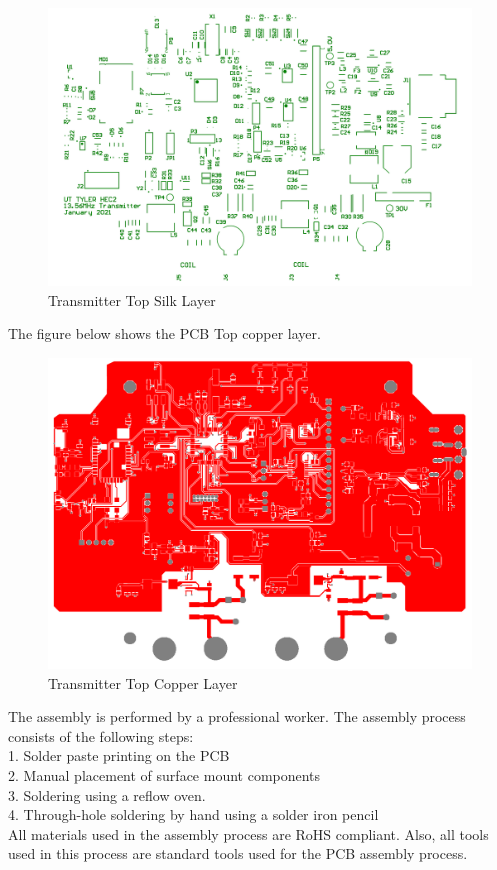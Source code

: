 \documentclass[12pt]{article}
\begin{document}
\begin{figure}[h!]
\centering
\includegraphics[width=0.75\linewidth]{tx_pcb_tslk}
\caption{Transmitter Top Silk Layer}
\end{figure}

The figure below shows the PCB Top copper layer.
\hfill

\begin{figure}[h!]
\centering
\includegraphics[width=0.75\linewidth]{tx_pcb_top_metal}
\caption{Transmitter Top Copper Layer}
\end{figure}

\hfill
\pagebreak
\hfill

\noindent
The assembly is performed by a professional worker. The assembly process consists of the following steps:\\
1.    Solder paste printing on the PCB\\
2.    Manual placement of surface mount components\\
3.    Soldering using a reflow oven.\\
4.    Through-hole soldering by hand using a solder iron pencil\\
 
 \noindent
All materials used in the assembly process are  RoHS compliant. Also, all tools used in this process are standard tools used for the PCB assembly process.
\end{document}
